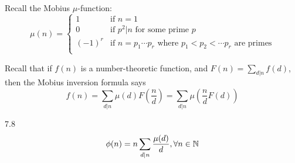 \begin{note}
    Recall the Mobius $\mu$-function:
    \[
        \mu(n) = \begin{cases}
            1 &\text{if } n = 1\\
            0 &\text{if } p^2 | n \text{ for some prime } p\\
            {(-1)}^r &\text{if } n = p_1 \cdots p_r \text{ where } p_1 < p_2 < \cdots p_r \text{ are primes}\\
        \end{cases}
    \]

    Recall that if $f(n)$ is a number-theoretic function, \newline
    and $F(n) = \sum_{d|n}^{}{f(d)}$,\newline
    then the Mobius inversion formula says
    \[
        f(n) = \sum_{d|n}^{}{\mu(d)F(\frac{n}{d})} = \sum_{d|n}^{}{\mu(\frac{n}{d}F(d))}
    \]
\end{note}

\begin{theorem}
    7.8
    \[
        \phi(n) = n \sum_{d|n}{\frac{\mu(d)}{d}}, \forall n \in \mathbb{N}
    \]
\end{theorem}
